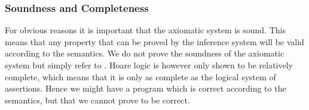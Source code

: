 \subsubsection{Soundness and Completeness}
For obvious reasons it is important that the axiomatic system is sound. This means that any property that can be proved by the inference system will be valid according to the semantics.
We do not prove the soundness of the axiomatic system but simply refer to \cite{nielson}.
Hoare logic is however only shown to be relatively complete\cite{cook}, which means that it is only as complete as the logical system of assertions.
Hence we might have a program which is correct according to the semantics, but that we cannot prove to be correct.
